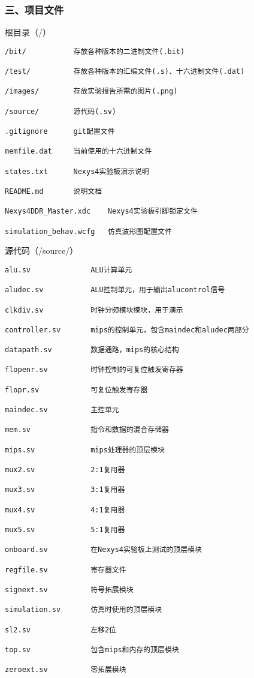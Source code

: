 \documentclass[]{article}
\begin{document}
\subsubsection{三、项目文件}\label{header-n1851}

根目录（/）

\begin{verbatim}
/bit/			存放各种版本的二进制文件(.bit)

/test/			存放各种版本的汇编文件(.s)、十六进制文件(.dat)

/images/		存放实验报告所需的图片(.png)

/source/		源代码(.sv)

.gitignore		git配置文件

memfile.dat		当前使用的十六进制文件

states.txt		Nexys4实验板演示说明

README.md		说明文档

Nexys4DDR_Master.xdc	Nexys4实验板引脚锁定文件

simulation_behav.wcfg	仿真波形图配置文件
\end{verbatim}

源代码（/source/）

\begin{verbatim}
alu.sv				ALU计算单元

aludec.sv 			ALU控制单元，用于输出alucontrol信号

clkdiv.sv 			时钟分频模块模块，用于演示

controller.sv 		mips的控制单元，包含maindec和aludec两部分

datapath.sv 		数据通路，mips的核心结构

flopenr.sv 			时钟控制的可复位触发寄存器

flopr.sv 			可复位触发寄存器

maindec.sv 			主控单元

mem.sv 				指令和数据的混合存储器

mips.sv				mips处理器的顶层模块

mux2.sv 			2:1复用器

mux3.sv 			3:1复用器

mux4.sv 			4:1复用器

mux5.sv 			5:1复用器

onboard.sv			在Nexys4实验板上测试的顶层模块

regfile.sv	 		寄存器文件

signext.sv 			符号拓展模块

simulation.sv 		仿真时使用的顶层模块

sl2.sv 				左移2位

top.sv 				包含mips和内存的顶层模块

zeroext.sv 			零拓展模块
\end{verbatim}
\end{document}
